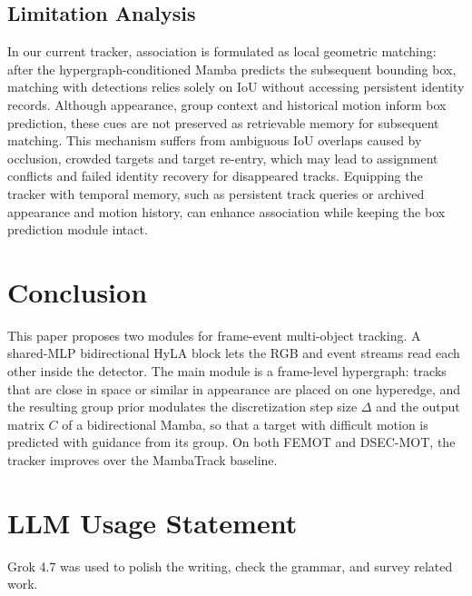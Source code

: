 \documentclass[10pt,twocolumn,letterpaper]{article}
\begin{document}
\subsection{Limitation Analysis}
\label{sec:limit}

In our current tracker, association is formulated as local geometric matching: after the hypergraph-conditioned Mamba predicts the subsequent bounding box, matching with detections relies solely on IoU without accessing persistent identity records. Although appearance, group context and historical motion inform box prediction, these cues are not preserved as retrievable memory for subsequent matching. This mechanism suffers from ambiguous IoU overlaps caused by occlusion, crowded targets and target re-entry, which may lead to assignment conflicts and failed identity recovery for disappeared tracks. Equipping the tracker with temporal memory, such as persistent track queries or archived appearance and motion history, can enhance association while keeping the box prediction module intact.


\section{Conclusion}

This paper proposes two modules for frame-event multi-object tracking. A shared-MLP bidirectional HyLA block lets the RGB and event streams read each other inside the detector. The main module is a frame-level hypergraph: tracks that are close in space or similar in appearance are placed on one hyperedge, and the resulting group prior modulates the discretization step size $\Delta$ and the output matrix $C$ of a bidirectional Mamba, so that a target with difficult motion is predicted with guidance from its group. On both FEMOT and DSEC-MOT, the tracker improves over the MambaTrack baseline.

\FloatBarrier
\section*{LLM Usage Statement}

Grok 4.7 was used to polish the writing, check the grammar, and survey related work. 

{
    \small
    
    
}

\end{document}
